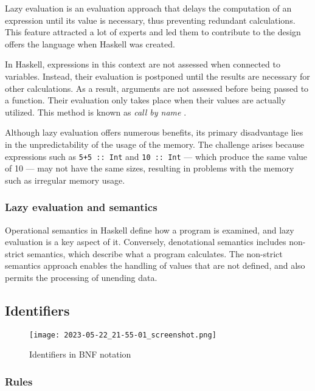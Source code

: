 \documentclass[a4paper, titlepage, twoside]{article}
\begin{document}
Lazy evaluation is an evaluation approach that delays the computation of an expression until its value is necessary, thus preventing redundant calculations. This feature attracted a lot of experts and led them to contribute to the design offers the language when Haskell was created.

In Haskell, expressions in this context are not assessed when connected to variables. Instead, their evaluation is postponed until the results are necessary for other calculations. As a result, arguments are not assessed before being passed to a function. Their evaluation only takes place when their values are actually utilized. This method is known as \emph{call by name} \autocite{haskellwikiHaskellHaskellWiki2023}.

Although lazy evaluation offers numerous benefits, its primary disadvantage lies in the unpredictability of the usage of the memory. The challenge arises because expressions such as \texttt{5+5 :: Int} and \texttt{10 :: Int} --- which produce the same value of 10 --- may not have the same sizes, resulting in problems with the memory such as irregular memory usage.

\subsubsection{Lazy evaluation and semantics}
\label{sec:org3676226}

Operational semantics in Haskell define how a program is examined, and lazy evaluation is a key aspect of it. Conversely, denotational semantics includes non-strict semantics, which describe what a program calculates. The non-strict semantics approach enables the handling of values that are not defined, and also permits the processing of unending data.

\subsection{Identifiers}
\label{sec:org690d174}

\begin{figure}[htbp]
\centering
\texttt{[image: 2023-05-22\_21-55-01\_screenshot.png]}
\caption{Identifiers in BNF notation \autocite[section 2.4]{marlowHaskell2010Language2010}}
\end{figure}


\subsubsection{Rules}
\label{sec:orgea56780}
\end{document}
